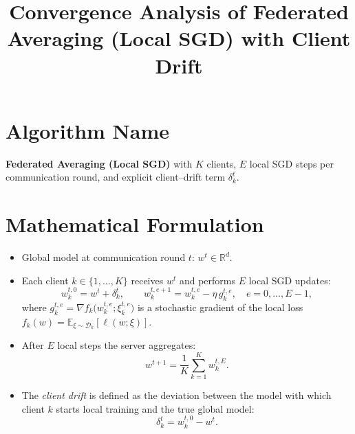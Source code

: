 \documentclass{article}
\begin{document}
\title{Convergence Analysis of Federated Averaging (Local SGD) with Client Drift}
\author{}
\date{}
\maketitle

\section*{Algorithm Name}
\textbf{Federated Averaging (Local SGD)} with $K$ clients, $E$ local SGD steps per communication round, and explicit client–drift term $\delta_{k}^{t}$.

\section*{Mathematical Formulation}
\begin{itemize}
    \item Global model at communication round $t$: $w^{t}\in\mathbb{R}^{d}$.
    \item Each client $k\in\{1,\dots,K\}$ receives $w^{t}$ and performs $E$ local SGD updates:
    \begin{equation}
        w_{k}^{t,0}=w^{t}+\delta_{k}^{t},\qquad
        w_{k}^{t,e+1}=w_{k}^{t,e}-\eta\, g_{k}^{t,e},\quad e=0,\dots,E-1,
    \end{equation}
    where $g_{k}^{t,e}= \nabla f_{k}\bigl(w_{k}^{t,e};\xi_{k}^{t,e}\bigr)$ is a stochastic gradient of the local loss
    $f_{k}(w)=\mathbb{E}_{\xi\sim\mathcal{D}_{k}}[\ell(w;\xi)]$.
    \item After $E$ local steps the server aggregates:
    \begin{equation}
        w^{t+1}= \frac{1}{K}\sum_{k=1}^{K} w_{k}^{t,E}.
    \end{equation}
    \item The \emph{client drift} is defined as the deviation between the model with which client $k$ starts local training and the true global model:
    \[
        \delta_{k}^{t}= w_{k}^{t,0}-w^{t}.
    \]
\end{itemize}

\end{document}
